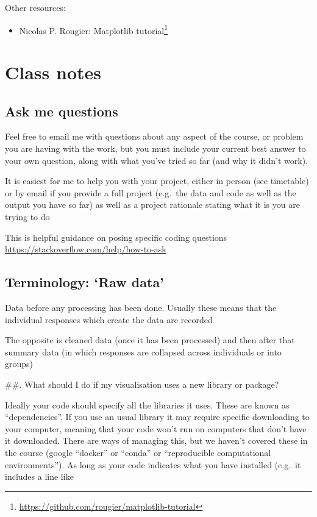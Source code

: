 \documentclass[
  12pt,
  a5paper,
]{book}
\DeclareRobustCommand{\href}[2]{#2\footnote{\url{#1}}}
\providecommand{\tightlist}{%
  \setlength{\itemsep}{0pt}\setlength{\parskip}{0pt}}
\begin{document}
Other resources:

\begin{itemize}
\tightlist
\item
  Nicolas P. Rougier: \href{https://github.com/rougier/matplotlib-tutorial}{Matplotlib tutorial}
\end{itemize}

\hypertarget{appendix-appendices}{%
\appendix {}}


\hypertarget{class-notes}{%
\chapter{Class notes}\label{class-notes}}

\hypertarget{ask-me-questions}{%
\section{Ask me questions}\label{ask-me-questions}}

Feel free to email me with questions about any aspect of the course, or problem you are having with the work, but you must include your current best answer to your own question, along with what you've tried so far (and why it didn't work).

It is easiest for me to help you with your project, either in person (see timetable) or by email if you provide a full project (e.g.~the data and code as well as the output you have so far) as well as a project rationale stating what it is you are trying to do

This is helpful guidance on posing specific coding questions \url{https://stackoverflow.com/help/how-to-ask}

\hypertarget{terminology-raw-data}{%
\section{Terminology: `Raw data'}\label{terminology-raw-data}}

Data before any processing has been done. Usually these means that the individual responses which create the data are recorded

The opposite is cleaned data (once it has been processed) and then after that summary data (in which responses are collapsed across individuals or into groups)

\#\#. What should I do if my visualisation uses a new library or package?

Ideally your code should specify all the libraries it uses. These are known as ``dependencies''. If you use an usual library it may require specific downloading to your computer, meaning that your code won't run on computers that don't have it downloaded. There are ways of managing this, but we haven't covered these in the course (google ``docker'' or ``conda'' or ``reproducible computational environments''). As long as your code indicates what you have installed (e.g.~it includes a line like
\end{document}
